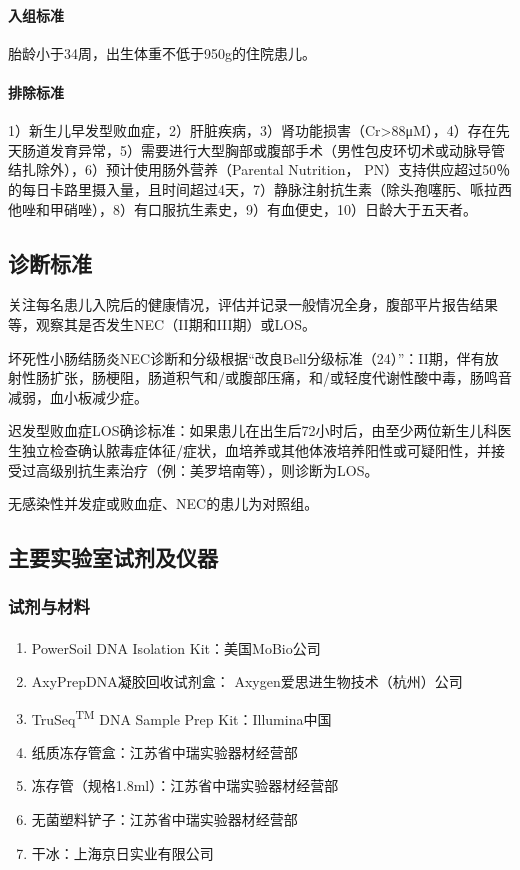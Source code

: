       \paragraph{入组标准}
      胎龄小于34周，出生体重不低于950g的住院患儿。
      \paragraph{排除标准}
      1）新生儿早发型败血症，2）肝脏疾病，3）肾功能损害（Cr>88μM），4）存在先天肠道发育异常，5）需要进行大型胸部或腹部手术（男性包皮环切术或动脉导管结扎除外），6）预计使用肠外营养（Parental Nutrition， PN）支持供应超过50％的每日卡路里摄入量，且时间超过4天，7）静脉注射抗生素（除头孢噻肟、哌拉西他唑和甲硝唑），8）有口服抗生素史，9）有血便史，10）日龄大于五天者。
  \subsection{诊断标准}
  关注每名患儿入院后的健康情况，评估并记录一般情况全身，腹部平片报告结果等，观察其是否发生NEC（II期和III期）或LOS。

  坏死性小肠结肠炎NEC诊断和分级根据“改良Bell分级标准（24）”：II期，伴有放射性肠扩张，肠梗阻，肠道积气和/或腹部压痛，和/或轻度代谢性酸中毒，肠鸣音减弱，血小板减少症。

  迟发型败血症LOS确诊标准：如果患儿在出生后72小时后，由至少两位新生儿科医生独立检查确认脓毒症体征/症状，血培养或其他体液培养阳性或可疑阳性，并接受过高级别抗生素治疗（例：美罗培南等），则诊断为LOS。

  无感染性并发症或败血症、NEC的患儿为对照组。

  \subsection{主要实验室试剂及仪器}
  \label{主要实验室试剂及仪器}
    \subsubsection{试剂与材料}
    \begin{enumerate}
      \item PowerSoil\textsuperscript{\textregistered} DNA Isolation Kit：美国MoBio公司
      \item AxyPrepDNA凝胶回收试剂盒： Axygen爱思进生物技术（杭州）公司
      \item TruSeq\textsuperscript{TM} DNA Sample Prep Kit：Illumina中国
      \item 纸质冻存管盒：江苏省中瑞实验器材经营部
      \item 冻存管（规格1.8ml）：江苏省中瑞实验器材经营部
      \item 无菌塑料铲子：江苏省中瑞实验器材经营部
      \item 干冰：上海京日实业有限公司
    \end{enumerate}
